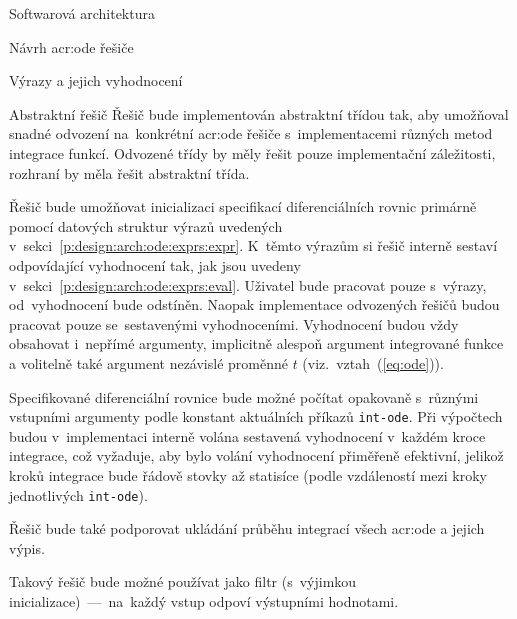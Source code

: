 \documentclass[thesis=M,czech]{FITthesis}[2012/06/26]
\newcommand{\acrlabel}[1]{acr:#1}
\newcommand{\acr}[1]{\acrshort{\acrlabel{#1}}}
\newcommand{\id}[1]{\texttt{#1}}
\newcommand{\rf}[1]{\ref{#1}}
\newcommand{\rfeq}[1]{(\rf{eq:#1})}
\begin{document}
\begin{section}{Softwarová architektura}
\begin{subsection}{Návrh \acr{ode} řešiče}
\begin{subsubsection}{Výrazy a jejich vyhodnocení}

\end{subsubsection} %


\begin{subsubsection}{Abstraktní řešič}\label{sss:design:arch:ode:solver}
Řešič bude implementován abstraktní třídou tak,
aby umožňoval snadné odvození na~konkrétní \acr{ode} řešiče
s~implementacemi různých metod integrace funkcí.
Odvozené třídy by měly řešit pouze implementační záležitosti,
rozhraní by měla řešit abstraktní třída.

Řešič bude umožňovat inicializaci
specifikací diferenciálních rovnic
primárně pomocí datových struktur výrazů uvedených
v~sekci~\rf{p:design:arch:ode:exprs:expr}.
K~těmto výrazům si řešič interně sestaví odpovídající
vyhodnocení tak, jak jsou uvedeny
v~sekci~\rf{p:design:arch:ode:exprs:eval}.
Uživatel bude pracovat pouze s~výrazy,
od~vyhodnocení bude odstíněn.
Naopak implementace odvozených řešičů
budou pracovat pouze se~sestavenými vyhodnoceními.
Vyhodnocení budou vždy obsahovat i~nepřímé argumenty,
implicitně alespoň argument integrované funkce
a volitelně také argument nezávislé proměnné $t$
(viz.~vztah~\rfeq{ode}).

Specifikované diferenciální rovnice bude možné počítat opakovaně
s~různými vstupními argumenty podle konstant
aktuálních příkazů \id{int\--ode}.
Při výpočtech budou v~implementaci
interně volána sestavená vyhodnocení
v~každém kroce integrace,
což vyžaduje, aby bylo volání vyhodnocení
přiměřeně efektivní,
jelikož kroků integrace
bude řádově stovky až statisíce
(podle vzdáleností mezi kroky jednotlivých \id{int\--ode}).

Řešič bude také podporovat ukládání průběhu
integrací všech \acr{ode} a jejich výpis.

Takový řešič bude možné používat jako filtr
(s~výjimkou inicializace)~---~na~každý vstup
odpoví výstupními hodnotami.
\end{subsubsection} %


\end{subsection} %



\end{section}
\end{document}
